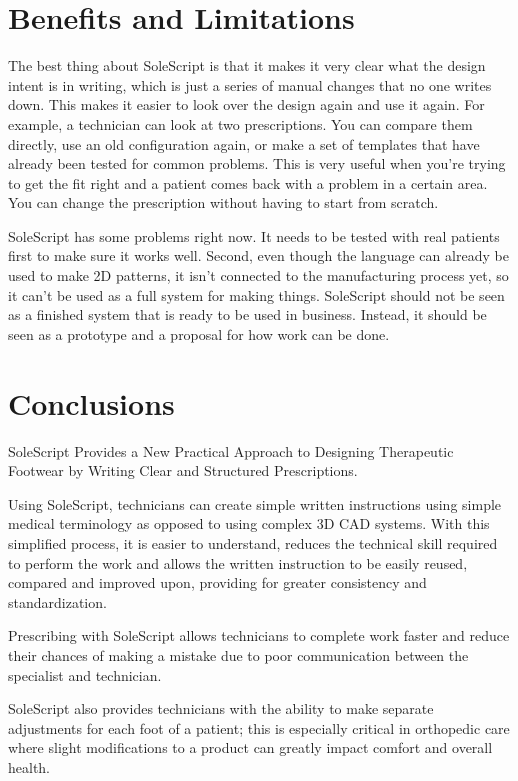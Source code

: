 \documentclass[12pt,a4paper]{article}
\begin{document}
\section{Benefits and Limitations}

The best thing about SoleScript is that it makes it very clear what the design intent is in writing, which is just a series of manual changes that no one writes down. This makes it easier to look over the design again and use it again. For example, a technician can look at two prescriptions. You can compare them directly, use an old configuration again, or make a set of templates that have already been tested for common problems. This is very useful when you're trying to get the fit right and a patient comes back with a problem in a certain area. You can change the prescription without having to start from scratch.

SoleScript has some problems right now. It needs to be tested with real patients first to make sure it works well. Second, even though the language can already be used to make 2D patterns, it isn't connected to the manufacturing process yet, so it can't be used as a full system for making things. SoleScript should not be seen as a finished system that is ready to be used in business. Instead, it should be seen as a prototype and a proposal for how work can be done.


\section{Conclusions}
SoleScript Provides a New Practical Approach to Designing Therapeutic Footwear by Writing Clear and Structured Prescriptions.

Using SoleScript, technicians can create simple written instructions using simple medical terminology as opposed to using complex 3D CAD systems. With this simplified process, it is easier to understand, reduces the technical skill required to perform the work and allows the written instruction to be easily reused, compared and improved upon, providing for greater consistency and standardization.

Prescribing with SoleScript allows technicians to complete work faster and reduce their chances of making a mistake due to poor communication between the specialist and technician.

SoleScript also provides technicians with the ability to make separate adjustments for each foot of a patient; this is especially critical in orthopedic care where slight modifications to a product can greatly impact comfort and overall health.
\end{document}
